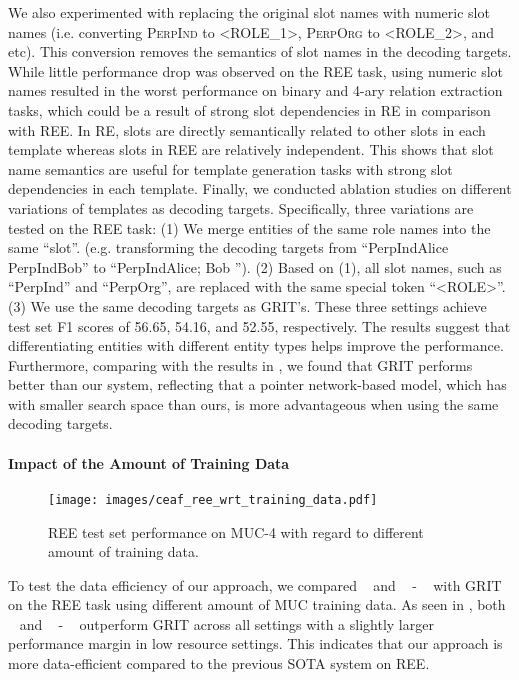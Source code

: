 \documentclass[11pt]{article}
\begin{document}
We also experimented with replacing the original slot names with numeric slot names (i.e. converting \textsc{PerpInd} to \textsc{<ROLE\_1>}, \textsc{PerpOrg} to \textsc{<ROLE\_2>}, and etc). This conversion removes the semantics of slot names in the decoding targets. While little performance drop was observed on the REE task, using numeric slot names resulted in the worst performance on binary and 4-ary relation extraction tasks, which could be a result of strong slot dependencies in RE in comparison with REE. In RE, slots are directly semantically related to other slots in each template whereas slots in REE are relatively independent. This shows that slot name semantics are useful for template generation tasks with strong slot dependencies in each template. 
Finally, we conducted ablation studies on different variations of templates as decoding targets. Specifically, three variations are tested on the REE task: (1) We merge entities of the same role names into the same ``slot''. (e.g. transforming the decoding targets from ``PerpIndAlice PerpIndBob'' to ``PerpIndAlice; Bob ''). (2) Based on (1), all slot names, such as ``PerpInd'' and ``PerpOrg'', are replaced with the same special token ``<ROLE>''. (3) We use the same decoding targets as GRIT's. These three settings achieve test set F1 scores of 56.65, 54.16, and 52.55, respectively. The results suggest that differentiating entities with different entity types helps improve the performance. Furthermore, comparing with the results in , we found that GRIT performs better than our system, reflecting that a pointer network-based model, which has with smaller search space than ours, is more advantageous when using the same decoding targets.




\paragraph{Impact of the Amount of Training Data}
\begin{figure}[t]
    \centering
    \texttt{[image: images/ceaf\_ree\_wrt\_training\_data.pdf]}
    \caption{REE test set performance on MUC-4 with regard to different amount of training data.}
    \label{fig:data_efficiency}
\end{figure}
To test the data efficiency of our approach, we compared \modelshort~ and \modelshort~ - \topkcopy~ with GRIT on the REE task using different amount of MUC training data. As seen in , both \modelshort~ and \modelshort~ - \topkcopy~ outperform GRIT across all settings with a slightly larger performance margin in low resource settings. This indicates that our approach is more data-efficient compared to the previous SOTA system on REE.
\end{document}

